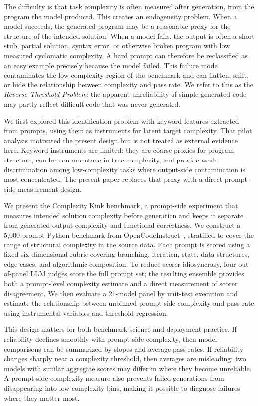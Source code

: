 \documentclass{article}
\begin{document}
The difficulty is that task complexity is often measured after generation, from the program the model produced. This creates an endogeneity problem. When a model succeeds, the generated program may be a reasonable proxy for the structure of the intended solution. When a model fails, the output is often a short stub, partial solution, syntax error, or otherwise broken program with low measured cyclomatic complexity. A hard prompt can therefore be reclassified as an easy example precisely because the model failed. This failure mode contaminates the low-complexity region of the benchmark and can flatten, shift, or hide the relationship between complexity and pass rate. We refer to this as the \emph{Reverse Threshold Problem}: the apparent unreliability of simple generated code may partly reflect difficult code that was never generated.

We first explored this identification problem with keyword features extracted from prompts, using them as instruments for latent target complexity. That pilot analysis motivated the present design but is not treated as external evidence here. Keyword instruments are limited: they are coarse proxies for program structure, can be non-monotone in true complexity, and provide weak discrimination among low-complexity tasks where output-side contamination is most concentrated. The present paper replaces that proxy with a direct prompt-side measurement design.

We present the Complexity Kink benchmark, a prompt-side experiment that measures intended solution complexity before generation and keeps it separate from generated-output complexity and functional correctness. We construct a 5{,}000-prompt Python benchmark from OpenCodeInstruct~\cite{opencodeinst}, stratified to cover the range of structural complexity in the source data. Each prompt is scored using a fixed six-dimensional rubric covering branching, iteration, state, data structures, edge cases, and algorithmic composition. To reduce scorer idiosyncrasy, four out-of-panel LLM judges score the full prompt set; the resulting ensemble provides both a prompt-level complexity estimate and a direct measurement of scorer disagreement. We then evaluate a 21-model panel by unit-test execution and estimate the relationship between unbinned prompt-side complexity and pass rate using instrumental variables and threshold regression.

This design matters for both benchmark science and deployment practice. If reliability declines smoothly with prompt-side complexity, then model comparisons can be summarized by slopes and average pass rates. If reliability changes sharply near a complexity threshold, then averages are misleading: two models with similar aggregate scores may differ in where they become unreliable. A prompt-side complexity measure also prevents failed generations from disappearing into low-complexity bins, making it possible to diagnose failures where they matter most.
\end{document}
